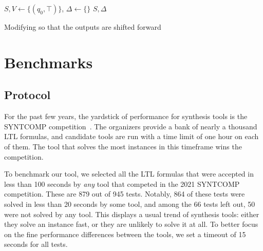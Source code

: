 \documentclass[runningheads,a4paper]{llncs}
\begin{document}
\begin{algorithm}[H]

\BlankLine
\(S,V \leftarrow \{(q_0,\top)\}\), \(\Delta \leftarrow \{\}\)\;
\Return \(S,\Delta\)
\caption{Modifying \cA so that the outputs are shifted forward}
\label{alg:caddys-madness}
\end{algorithm}

\section{Benchmarks}\label{sec:benchmarks}

\subsection{Protocol}

For the past few years, the yardstick of performance for synthesis tools is the
SYNTCOMP competition~\cite{syntcomp17}.  The organizers provide a bank of nearly a
thousand LTL formulas, and candidate tools are run with a time limit of one hour
on each of them.  The tool that solves the most instances in this timeframe wins
the competition.

To benchmark our tool, we selected all the LTL formulas that were accepted in
less than 100 seconds by \emph{any} tool that competed in the 2021 SYNTCOMP
competition.  These are 879 out of 945 tests.  Notably, 864 of these tests were
solved in less than 20 seconds by some tool, and among the 66 tests left out, 50
were not solved by any tool.  This displays a usual trend of synthesis tools:
either they solve an instance fast, or they are unlikely to solve it at all.  To
better focus on the fine performance differences between the tools, we set a
timeout of 15 seconds for all tests.
\end{document}

